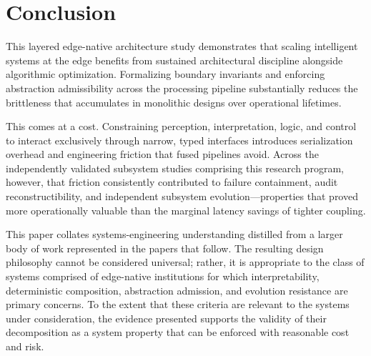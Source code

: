 \documentclass[conference]{IEEEtran}
\begin{document}
\section{Conclusion}
This layered edge-native architecture study demonstrates that scaling intelligent systems at the edge benefits from sustained architectural discipline alongside algorithmic optimization. Formalizing boundary invariants and enforcing abstraction admissibility across the processing pipeline substantially reduces the brittleness that accumulates in monolithic designs over operational lifetimes.

This comes at a cost. Constraining perception, interpretation, logic, and control to interact exclusively through narrow, typed interfaces introduces serialization overhead and engineering friction that fused pipelines avoid. Across the independently validated subsystem studies comprising this research program, however, that friction consistently contributed to failure containment, audit reconstructibility, and independent subsystem evolution---properties that proved more operationally valuable than the marginal latency savings of tighter coupling.

This paper collates systems-engineering understanding distilled from a larger body of work represented in the papers that follow. The resulting design philosophy cannot be considered universal; rather, it is appropriate to the class of systems comprised of edge-native institutions for which interpretability, deterministic composition, abstraction admission, and evolution resistance are primary concerns. To the extent that these criteria are relevant to the systems under consideration, the evidence presented supports the validity of their decomposition as a system property that can be enforced with reasonable cost and risk.
\end{document}
